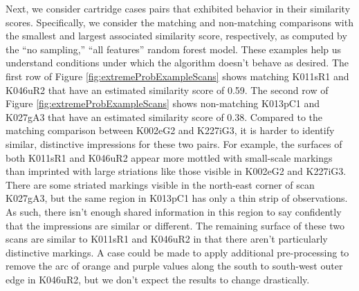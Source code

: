 \documentclass[11pt,]{isuthesis}
\begin{document}
Next, we consider cartridge cases pairs that exhibited behavior in their similarity scores.
Specifically, we consider the matching and non-matching comparisons with the smallest and largest associated similarity score, respectively, as computed by the ``no sampling,'' ``all features'' random forest model.
These examples help us understand conditions under which the algorithm doesn't behave as desired.
The first row of Figure \ref{fig:extremeProbExampleScans} shows matching K011sR1 and K046uR2 that have an estimated similarity score of 0.59.
The second row of Figure \ref{fig:extremeProbExampleScans} shows non-matching K013pC1 and K027gA3 that have an estimated similarity score of 0.38.
Compared to the matching comparison between K002eG2 and K227iG3, it is harder to identify similar, distinctive impressions for these two pairs.
For example, the surfaces of both K011sR1 and K046uR2 appear more mottled with small-scale markings than imprinted with large striations like those visible in K002eG2 and K227iG3.
There are some striated markings visible in the north-east corner of scan K027gA3, but the same region in K013pC1 has only a thin strip of observations.
As such, there isn't enough shared information in this region to say confidently that the impressions are similar or different.
The remaining surface of these two scans are similar to K011sR1 and K046uR2 in that there aren't particularly distinctive markings.
A case could be made to apply additional pre-processing to remove the arc of orange and purple values along the south to south-west outer edge in K046uR2, but we don't expect the results to change drastically.
\end{document}
